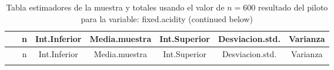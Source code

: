 \documentclass[
]{article}
\begin{document}
\begin{longtable}[]{@{}ccccccc@{}}
\caption{Tabla estimadores de la muestra y totales usando el valor de
\(n = 600\) resultado del piloto para la variable: fixed.acidity
(continued below)}\tabularnewline
\toprule
\begin{minipage}[b]{0.20\columnwidth}\centering
~\strut
\end{minipage} & \begin{minipage}[b]{0.04\columnwidth}\centering
n\strut
\end{minipage} & \begin{minipage}[b]{0.11\columnwidth}\centering
Int.Inferior\strut
\end{minipage} & \begin{minipage}[b]{0.12\columnwidth}\centering
Media.muestra\strut
\end{minipage} & \begin{minipage}[b]{0.11\columnwidth}\centering
Int.Superior\strut
\end{minipage} & \begin{minipage}[b]{0.13\columnwidth}\centering
Desviacion.std.\strut
\end{minipage} & \begin{minipage}[b]{0.09\columnwidth}\centering
Varianza\strut
\end{minipage}\tabularnewline
\midrule
\endfirsthead
\toprule
\begin{minipage}[b]{0.20\columnwidth}\centering
~\strut
\end{minipage} & \begin{minipage}[b]{0.04\columnwidth}\centering
n\strut
\end{minipage} & \begin{minipage}[b]{0.11\columnwidth}\centering
Int.Inferior\strut
\end{minipage} & \begin{minipage}[b]{0.12\columnwidth}\centering
Media.muestra\strut
\end{minipage} & \begin{minipage}[b]{0.11\columnwidth}\centering
Int.Superior\strut
\end{minipage} & \begin{minipage}[b]{0.13\columnwidth}\centering
Desviacion.std.\strut
\end{minipage} & \begin{minipage}[b]{0.09\columnwidth}\centering
Varianza\strut
\end{minipage}\tabularnewline
\midrule
\endhead
\begin{minipage}[t]{0.20\columnwidth}\centering

\end{minipage}
\end{longtable}
\end{document}

